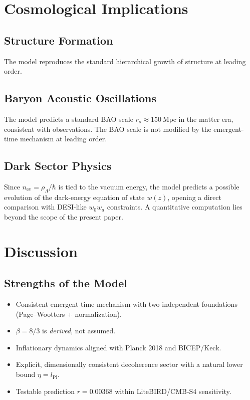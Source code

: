 \documentclass[11pt,a4paper]{article}
\begin{document}
\section{Cosmological Implications}
\subsection{Structure Formation}
The model reproduces the standard hierarchical growth of structure
at leading order.

\subsection{Baryon Acoustic Oscillations}
The model predicts a standard BAO scale
$r_{s}\approx150\ \mathrm{Mpc}$ in the matter era, consistent with
observations. The BAO scale is not modified by the emergent-time
mechanism at leading order.

\subsection{Dark Sector Physics}
Since $n_{\mathrm{ev}}=\rho_{\Lambda}/\hbar$ is tied to the vacuum
energy, the model predicts a possible evolution of the dark-energy
equation of state $w(z)$, opening a direct comparison with
DESI-like $w_{0}w_{a}$ constraints. A quantitative computation lies
beyond the scope of the present paper.

\section{Discussion}
\subsection{Strengths of the Model}
\begin{itemize}
\item Consistent emergent-time mechanism with two independent
      foundations (Page--Wootters + normalization).
\item $\beta=8/3$ is \emph{derived}, not assumed.
\item Inflationary dynamics aligned with Planck 2018 and BICEP/Keck.
\item Explicit, dimensionally consistent decoherence sector with a
      natural lower bound $\eta=l_{\mathrm{Pl}}$.
\item Testable prediction $r=0.00368$ within LiteBIRD/CMB-S4
      sensitivity.
\end{itemize}
\end{document}
